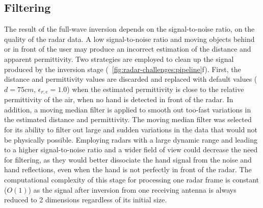 




\subsection{Filtering} \label{sec:radar-challenges:processing-strategy:filtering}
The result of the full-wave inversion depends on the signal-to-noise ratio, \ie on the quality of the radar data. 
A low signal-to-noise ratio and moving objects behind or in front of the user may produce an incorrect estimation of the distance and apparent permittivity. Two strategies are employed to clean up the signal produced by the inversion stage (\fig~\ref{fig:radar-challenges:pipeline}f). First, the distance and permittivity values are discarded and replaced with default values ($d{=}75 cm$, $\epsilon_{r,e}{=}1.0$) when the estimated permittivity is close to the relative permittivity of the air, \ie when no hand is detected in front of the radar. In addition, a moving median filter is applied to smooth out too-fast variations in the estimated distance and permittivity. The moving median filter was selected for its ability to filter out large and sudden variations in the data that would not be physically possible.
Employing radars with a large dynamic range and leading to a higher signal-to-noise ratio and a wider field of view could decrease the need for filtering, as they would better dissociate the hand signal from the noise and hand reflections, even when the hand is not perfectly in front of the radar.
%
The computational complexity of this stage for processing one radar frame is constant ($O(1)$) as the signal after inversion from one receiving antenna is always reduced to 2 dimensions regardless of its initial size.

